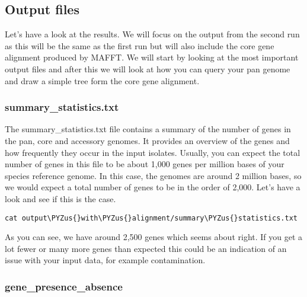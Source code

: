 \documentclass[11pt]{article}
\makeatletter
\def\PYZus{\char`\_}
\newcommand{\boxspacing}{\kern\kvtcb@left@rule\kern\kvtcb@boxsep}
\newcommand{\prompt}[4]{
         {\ttfamily\llap{{\color{blue}\LARGE\faKeyboardO\hspace{3pt}#4}}\vspace{-\baselineskip}}
    }
\makeatother
\begin{document}
\hypertarget{output-files}{%
\subsection{Output files}\label{output-files}}

Let's have a look at the results. We will focus on the output from the
second run as this will be the same as the first run but will also
include the core gene alignment produced by MAFFT. We will start by
looking at the most important output files and after this we will look
at how you can query your pan genome and draw a simple tree form the
core gene alignment.

\hypertarget{summary_statistics.txt}{%
\subsubsection{summary\_statistics.txt}\label{summary_statistics.txt}}

The summary\_statistics.txt file contains a summary of the number of
genes in the pan, core and accessory genomes. It provides an overview of
the genes and how frequently they occur in the input isolates. Usually,
you can expect the total number of genes in this file to be about 1,000
genes per million bases of your species reference genome. In this case,
the genomes are around 2 million bases, so we would expect a total
number of genes to be in the order of 2,000. Let's have a look and see
if this is the case.

    \begin{tcolorbox}[breakable, size=fbox, boxrule=1pt, pad at break*=1mm,colback=cellbackground, colframe=cellborder]
\prompt{In}{incolor}{ }{\boxspacing}
\begin{Verbatim}[commandchars=\\\{\}]
cat output\PYZus{}with\PYZus{}alignment/summary\PYZus{}statistics.txt
\end{Verbatim}
\end{tcolorbox}

    As you can see, we have around 2,500 genes which seems about right. If
you get a lot fewer or many more genes than expected this could be an
indication of an issue with your input data, for example contamination.

\hypertarget{gene_presence_absence}{%
\subsubsection{gene\_presence\_absence}\label{gene_presence_absence}}
\end{document}
